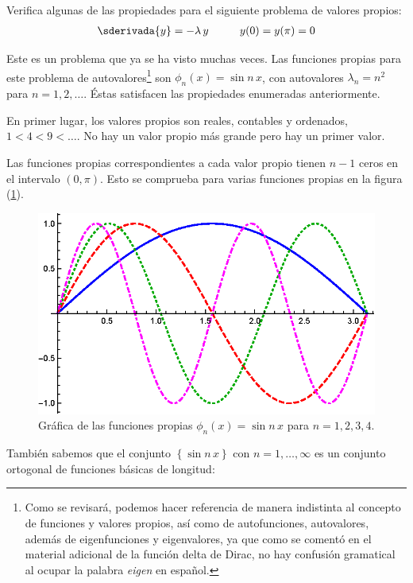 \begin{ejemplo}
Verifica algunas de las propiedades para el siguiente problema de valores propios:
\begin{align*}
\sderivada{y} = - \lambda \, y \hspace{1cm} y(0) = y(\pi) = 0
\end{align*}

Este es un problema que ya se ha visto muchas veces. Las funciones propias para este problema de autovalores\footnote{Como se revisará, podemos hacer referencia de manera indistinta al concepto de funciones y valores propios, así como de autofunciones, autovalores, además de eigenfunciones y eigenvalores, ya que como se comentó en el material adicional de la función delta de Dirac, no hay confusión gramatical al ocupar la palabra \emph{eigen} en español.} son $\phi_{n} (x) = \sin n\, x$, con autovalores $\lambda_{n} = n^{2}$ para $n = 1, 2, \ldots$. Éstas satisfacen las propiedades enumeradas anteriormente.
\par
En primer lugar, los valores propios son reales, contables y ordenados, $1 < 4 < 9 < \ldots$. No hay un valor propio más grande pero hay un primer valor.
\par
Las funciones propias correspondientes a cada valor propio tienen $n -1$ ceros en el intervalo $(0, \pi)$. Esto se comprueba para varias funciones propias en la figura (\ref{fig:figura_04_01}).
\begin{figure}[H]
    \centering
    \includegraphics[scale=1.3]{Imagenes/Eigenfunciones_Sin_nx.eps}
    \caption{Gráfica de las funciones propias $\phi_{n} (x) = \sin n \,x$ para $n = 1, 2, 3, 4$.}
    \label{fig:figura_04_01}
\end{figure}
También sabemos que el conjunto $\left\{ \sin n \, x \right\}$ con $n = 1, \ldots, \infty$ es un conjunto ortogonal de funciones básicas de longitud:

\end{ejemplo}
